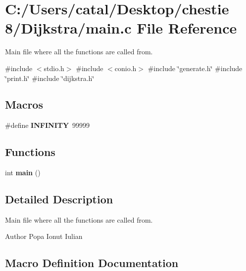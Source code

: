 \section{C\+:/\+Users/catal/\+Desktop/chestie 8/\+Dijkstra/main.c File Reference}
\label{main_8c}


Main file where all the functions are called from.  


{\ttfamily \#include $<$stdio.\+h$>$}\newline
{\ttfamily \#include $<$conio.\+h$>$}\newline
{\ttfamily \#include \char`\"{}generate.\+h\char`\"{}}\newline
{\ttfamily \#include \char`\"{}print.\+h\char`\"{}}\newline
{\ttfamily \#include \char`\"{}dijkstra.\+h\char`\"{}}\newline
\subsection*{Macros}
\begin{DoxyCompactItemize}
\item 
\#define \textbf{ I\+N\+F\+I\+N\+I\+TY}~99999
\end{DoxyCompactItemize}
\subsection*{Functions}
\begin{DoxyCompactItemize}
\item 
int \textbf{ main} ()
\end{DoxyCompactItemize}


\subsection{Detailed Description}
Main file where all the functions are called from. 

\begin{DoxyAuthor}{Author}
Popa Ionut Iulian 
\end{DoxyAuthor}


\subsection{Macro Definition Documentation}
\mbox{\label{main_8c_a956e2723d559858d08644ac99146e910}} 

